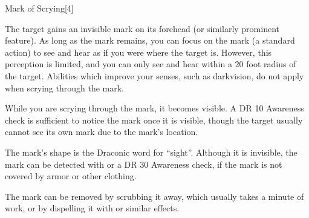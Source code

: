 \begin{spellsection}{Mark of Scrying}[4]
    \begin{spellheader}
    \end{spellheader}
    \begin{spellcontent}
        \begin{spelltargetinginfo}
        \end{spelltargetinginfo}
        \begin{spelleffects}
            \spelleffect The target gains an invisible mark on its forehead (or similarly prominent feature).
            As long as the mark remains, you can focus on the mark (a standard action) to see and hear as if you were where the target is.
            However, this perception is limited, and you can only see and hear within a 20 foot radius of the target.
            Abilities which improve your senses, such as darkvision, do not apply when scrying through the mark.

            While you are scrying through the mark, it becomes visible.
            A DR 10 Awareness check is sufficient to notice the mark once it is visible, though the target usually cannot see its own mark due to the mark's location.
            \spelldur \durlong
        \end{spelleffects}
    \end{spellcontent}
    \begin{spellfooter}
        \spellnotes The mark's shape is the Draconic word for ``sight''.
        Although it is invisible, the mark can be detected with  or a DR 30 Awareness check, if the mark is not covered by armor or other clothing.

        The mark can be removed by scrubbing it away, which usually takes a minute of work, or by dispelling it with  or similar effects.
        \miscastrandom
    \end{spellfooter}
    \begin{spellaugments}
    \end{spellaugments}
\end{spellsection}

